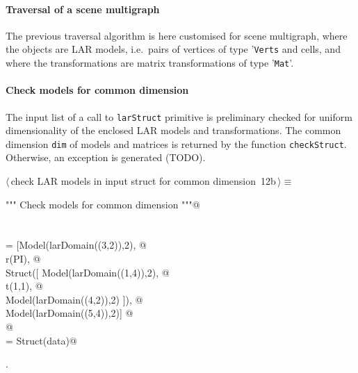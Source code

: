 \documentclass[11pt,oneside]{article}	%
\begin{document}
\paragraph{Traversal of a scene multigraph}

The previous traversal algorithm is here customised for scene multigraph, where the objects are LAR models, i.e.~pairs of vertices of type '\texttt{Verts} and cells, and where the transformations are matrix transformations of type '\texttt{Mat}'.

\paragraph{Check models for common dimension}
The input list of a call to \texttt{larStruct} primitive is preliminary checked for uniform dimensionality of the enclosed LAR models and transformations. The common dimension \texttt{dim} of models and matrices is returned by the function \texttt{checkStruct}. Otherwise, an exception is generated (TODO).

\begin{flushleft} \small \label{scrap25}
\protect{}$\langle\,$check LAR models in input struct for common dimension\nobreak\ {\footnotesize 12b}$\,\rangle\equiv$
\vspace{-1ex}
\begin{list}{}{} \item
\mbox{}\verb@""" Check models for common dimension """@\\
\mbox{}\verb@@\\
\mbox{}\verb@@\\
\mbox{}\verb@data = [Model(larDomain((3,2)),2), @\\
\mbox{}\verb@      r(PI), @\\
\mbox{}\verb@      Struct([ Model(larDomain((1,4)),2), @\\
\mbox{}\verb@        t(1,1), @\\
\mbox{}\verb@        Model(larDomain((4,2)),2) ]), @\\
\mbox{}\verb@      Model(larDomain((5,4)),2)] @\\
\mbox{}\verb@      @\\
\mbox{}\verb@a = Struct(data)@\\
\mbox{}\verb@@{\NWsep}
\end{list}
\vspace{-1ex}
\footnotesize\addtolength{\baselineskip}{-1ex}
\begin{list}{}{\setlength{\itemsep}{-\parsep}\setlength{\itemindent}{-\leftmargin}}
\item {\NWtxtMacroNoRef}.
\end{list}
\end{flushleft}
\end{document}
